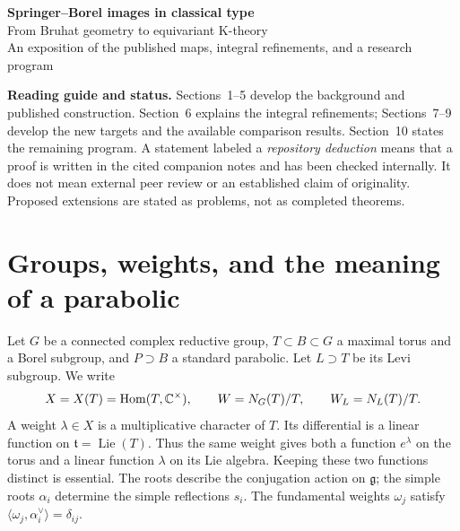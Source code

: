\documentclass[11pt,letterpaper]{article}
\theoremstyle{definition}\newtheorem{definition}[theorem]{Definition}
\begin{document}
\begin{center}
{\LARGE\bfseries Springer--Borel images in classical type}\\[6pt]
{\Large From Bruhat geometry to equivariant K-theory}\\[7pt]
{\small An exposition of the published maps, integral refinements, and a research program}
\end{center}
\begin{abstract}
Springer morphisms turn a representation of a reductive group into a
polynomial subring of its Levi representation rings. The Borel
characteristic map then sends these polynomial characters to flag
cohomology. We explain the geometry and algebra behind this construction,
including Bruhat cells, Schubert bases, Weyl invariants, the meaning of the
classical parameters, and the distinction between normalized and literal
integral sources. We review the published results of Kumar,
Kumar--Rogers, and Kumar--Xie, and the subsequent internally audited
integral-image deductions. We then introduce equivariant cohomology,
ordinary and equivariant K-theory, and the precise image problems these
theories suggest. The immediate emphasis is on uniform results in the
classical families \(A,B,C,D\).
\end{abstract}
\noindent\textbf{Reading guide and status.}
Sections~1--5 develop the background and published construction.
Section~6 explains the integral refinements; Sections~7--9 develop the
new targets and the available comparison results. Section~10 states the
remaining program. A statement labeled a \emph{repository deduction}
means that a proof is written in the cited companion notes and has been
checked internally. It does not mean external peer review or an
established claim of originality. Proposed extensions are stated as
problems, not as completed theorems.

\section{Groups, weights, and the meaning of a parabolic}
Let \(G\) be a connected complex reductive group, \(T\subset B\subset G\)
a maximal torus and a Borel subgroup, and \(P\supset B\) a standard
parabolic. Let \(L\supset T\) be its Levi subgroup. We write
\[
 X=X(T)=\operatorname{Hom}(T,\mathbb C^\times),\qquad
 W=N_G(T)/T,\qquad W_L=N_L(T)/T.
\]
A weight \(\lambda\in X\) is a multiplicative character of \(T\).
Its differential is a linear function on
\(\mathfrak t=\operatorname{Lie}(T)\). Thus the same weight gives both
a function \(e^\lambda\) on the torus and a linear function \(\lambda\)
on its Lie algebra. Keeping these two functions distinct is essential.
The roots describe the conjugation action on \(\mathfrak g\); the
simple roots \(\alpha_i\) determine the simple reflections \(s_i\).
The fundamental weights \(\omega_j\) satisfy
\(\langle\omega_j,\alpha_i^\vee\rangle=\delta_{ij}\).
\end{document}
